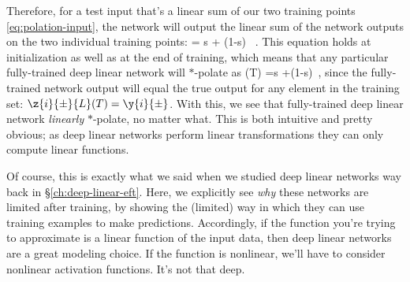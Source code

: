 Therefore, for a test input that's a
linear sum of our two training points \eqref{eq:polation-input}, the network will output the linear sum of the network outputs on the two individual training points:
\be\label{eq:linear-polation-at-init}
= s + (1-s) \, .
\ee
This equation holds at initialization as well as at the end of training, which means that any particular fully-trained deep linear network will $\ast$-polate as
\be\label{eq:linear-polation}
(T) =s +(1-s)\, ,
\ee
since the fully-trained network output will equal the true output for any element in the training set: $\z{i}{\pm}{L}(T) = \y{i}{\pm}$. With this, we see that fully-trained deep linear network \emph{linearly} $\ast$-polate, no matter what. This is both intuitive and pretty obvious; as deep linear networks perform linear transformations they can only compute linear functions. 

Of course, this is exactly what we said when we studied deep linear networks way back
in \S\ref{ch:deep-linear-eft}.
Here, we explicitly see \emph{why} these networks are limited after training, by showing the (limited) way in which they can use training examples to make predictions. Accordingly, if the function you're trying to approximate is a linear function of the input data, then deep linear networks are a great modeling choice. If the function is nonlinear, we'll have to consider nonlinear activation functions. 
It's not that deep.





















